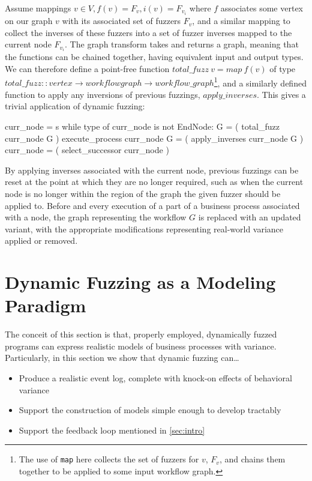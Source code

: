 \documentclass[12pt]{llncs}  %
\begin{document}
Assume mappings \(v \in V, f(v)=F_v, i(v)=F_{v_i}\) where $f$ associates some
vertex on our graph $v$ with its associated set of fuzzers $F_v$, and a similar
mapping to collect the inverses of these fuzzers into a set of fuzzer inverses
mapped to the current node $F_{v_i}$. The graph transform takes and returns a
graph, meaning that the functions can be chained together, having equivalent
input and output types. We can therefore define a point-free function
$total\_fuzz~v = map~f(v)$ of type $total\_fuzz :: vertex \rightarrow workflow
graph \rightarrow workflow\_graph$\footnote{The use of \texttt{map} here
  collects the set of fuzzers for $v$, $F_v$, and chains them together to be
  applied to some input workflow graph.}, and a similarly defined function to
apply any inversions of previous fuzzings, $apply\_inverses$. This gives a
trivial application of dynamic fuzzing:

\begin{algorithm}
  curr_node = s
  while type of curr_node is not EndNode:
    G = ( total_fuzz curr_node G )
    execute_process curr_node 
    G = ( apply_inverses curr_node G )
    curr_node = ( select_successor curr_node ) 
\end{algorithm}

By applying inverses associated with the current node, previous fuzzings can be
reset at the point at which they are no longer required, such as when the
current node is no longer within the region of the graph the given fuzzer should
be applied to. Before and every execution of a part of a business process
associated with a node, the graph representing the workflow $G$ is replaced with
an updated variant, with the appropriate modifications representing real-world
variance applied or removed.
\par

\section{Dynamic Fuzzing as a Modeling Paradigm}
\label{sec:dynamic_fuzzing_benefits}
The conceit of this section is that, properly employed, dynamically fuzzed
programs can express realistic models of business processes with variance.
Particularly, in this section we show that dynamic fuzzing can\ldots{}
\par

\begin{itemize}
\item Produce a realistic event log, complete with knock-on effects of
  behavioral variance
\item Support the construction of models simple enough to develop tractably
\item Support the feedback loop mentioned in \cref{sec:intro}
\end{itemize}
\end{document}
